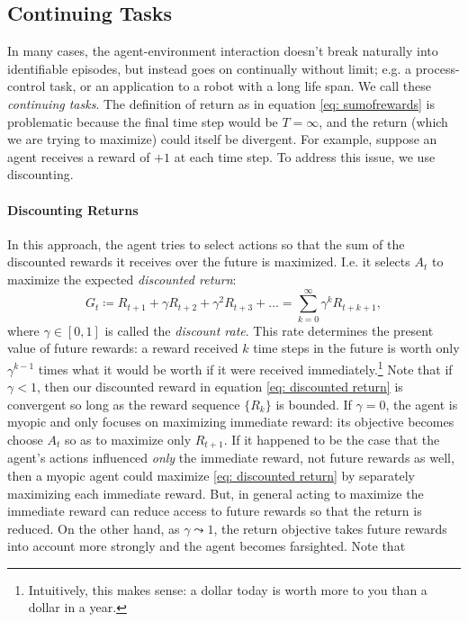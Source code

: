 \documentclass[12pt]{article}
\begin{document}
\subsection{Continuing Tasks} In many cases, the agent-environment interaction doesn't break naturally into identifiable episodes, but instead goes on continually without limit; e.g. a process-control task, or an application to a robot with a long life span. We call these \emph{continuing tasks}. The definition of return as in equation \ref{eq: sumofrewards} is problematic because the final time step would be $T =\infty$, and the return (which we are trying to maximize) could itself be divergent. For example, suppose an agent receives a reward of $+1$ at each time step. To address this issue, we use discounting.

\paragraph{Discounting Returns} In this approach, the agent tries to select actions so that the sum of the discounted rewards it receives over the future is maximized. I.e. it selects $A_t$ to maximize the expected \emph{discounted   return}:
\begin{equation}
  \label{eq: discounted return}
  G_t \coloneqq R_{t+1} + \gamma R_{t+2} + \gamma^2 R_{t+3} + \ldots = \sum_{k=0}^{\infty} \gamma^k R_{t+k+1},
\end{equation}
where $\gamma \in [0,1]$ is called the \emph{discount rate}. This rate determines the present value of future rewards: a reward received $k$ time steps in the future is worth only $\gamma^{k-1}$ times what it would be worth if it were received immediately.\footnote{Intuitively, this makes sense: a dollar today is worth more to you than a dollar in a year.} Note that if $\gamma < 1$, then our discounted reward in equation \ref{eq: discounted return} is convergent so long as the reward sequence $\{R_k\}$ is bounded. If $\gamma = 0$, the agent is myopic and only focuses on maximizing immediate reward: its objective becomes choose $A_t$ so as to maximize only $R_{t+1}$. If it happened to be the case that the agent's actions influenced \emph{only} the immediate reward, not future rewards as well, then a myopic agent could maximize \ref{eq: discounted return} by separately maximizing each immediate reward.  But, in general acting to maximize the immediate reward can reduce access to future rewards so that the return is reduced. On the other hand, as $\gamma \leadsto 1$, the return objective takes future rewards into account more strongly and the agent becomes farsighted. Note that
\end{document}
